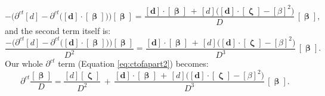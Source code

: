 \documentclass[12pt]{article}
\renewcommand{\vv}[1]{\mathbf{#1}}
\newcommand{\vvbeta}{\bm{\upbeta}}
\newcommand{\vvzeta}{\bm{\upzeta}}
\begin{document}
\begin{equation*}
- \Big( \partial^{ct} [d] - \partial^{ct} \big( [\vv d] \cdot [\vvbeta] \big) \Big) [\vvbeta] = \dfrac{[\vv d] \cdot [\vvbeta] \, + \, [d] \big( [\vv d] \cdot [\vvzeta] - [\beta]^2 \big)}{D} \, [\vvbeta] ,
\end{equation*}
and the second term itself is:
\begin{equation*}
\dfrac{ - \Big( \partial^{ct} [d] - \partial^{ct} \big( [\vv d] \cdot [\vvbeta] \big) \Big) [\vvbeta] }{D^2} = \dfrac{[\vv d] \cdot [\vvbeta] \, + \, [d] \big( [\vv d] \cdot [\vvzeta] - [\beta]^2 \big)}{D^3} \, [\vvbeta] .
\end{equation*}
Our whole $\partial^{ct}$ term (Equation \ref{eq:ctofapart2}) becomes:
\begin{equation}\label{eq:ctofapart3}
\partial^{ct} \dfrac{[\vvbeta]}{D} = \dfrac{[d] [\vvzeta]}{D^2} \, + \, \dfrac{[\vv d] \cdot [\vvbeta] \, + \, [d] \big( [\vv d] \cdot [\vvzeta] - [\beta]^2 \big)}{D^3} \, [\vvbeta] .
\end{equation}
\end{document}
